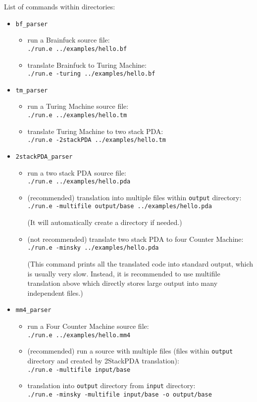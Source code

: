 \documentclass[english,shortabstract,mgr]{iithesis}
\begin{document}
List of commands within directories:
\begin{itemize}
  \item \texttt{bf\_parser}
    \begin{itemize}
      \item run a Brainfuck source file: \\ \texttt{./run.e ../examples/hello.bf}
      \item translate Brainfuck to Turing Machine: \\ \texttt{./run.e -turing ../examples/hello.bf}
    \end{itemize}
  \item \texttt{tm\_parser}
    \begin{itemize}
      \item run a Turing Machine source file: \\ \texttt{./run.e ../examples/hello.tm}
      \item translate Turing Machine to two stack PDA: \\ \texttt{./run.e -2stackPDA ../examples/hello.tm}
    \end{itemize}
  \item \texttt{2stackPDA\_parser}
    \begin{itemize}
      \item run a two stack PDA source file: \\ \texttt{./run.e ../examples/hello.pda}
      \item (recommended) translation into multiple files within \texttt{output}
        directory: \\ \texttt{./run.e -multifile output/base ../examples/hello.pda}

        (It will automatically create a directory if needed.)
      \item (not recommended) translate two stack PDA to four Counter Machine: \\ \texttt{./run.e -minsky ../examples/hello.pda}

        (This command prints all the translated code into standard output,
        which is usually very slow. Instead, it is recommended to use multifile
        translation above which directly stores large output into many independent
        files.)
    \end{itemize}
  \item \texttt{mm4\_parser}
    \begin{itemize}
      \item run a Four Counter Machine source file: \\ \texttt{./run.e ../examples/hello.mm4}
      \item (recommended) run a source with multiple files (files within \texttt{output}
        directory and created by 2StackPDA translation): \\ \texttt{./run.e -multifile input/base}
      \item translation into \texttt{output} directory from \texttt{input}
        directory: \\ \texttt{./run.e -minsky -multifile input/base -o output/base}


\end{itemize}
\end{itemize}
\end{document}
